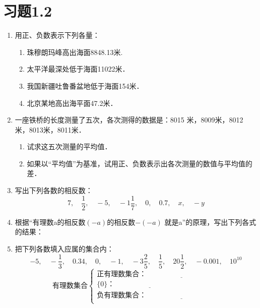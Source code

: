 \section*{习题1.2}
\begin{enumerate}
    \item 用正、负数表示下列各量：
    \begin{enumerate}
        \item 珠穆朗玛峰高出海面8848.13米.
        \item 太平洋最深处低于海面11022米．
        \item 我国新疆吐鲁番盆地低于海面154米．
        \item 北京某地高出海平面47.2米．
    \end{enumerate}
    \item 一座铁桥的长度测量了五次，各次测得的数据是：8015
    米，8009米，8012米，8013米，8011米．
    \begin{enumerate}
        \item 试求这五次测量的平均值．
        \item 如果以“平均值”为基准，试用正、负数表示出各次测量的数值与平均值的差．
    \end{enumerate}
\item 写出下列各数的相反数：
\[7,\quad \frac{1}{2},\quad -5,\quad -1\frac{1}{7},\quad 0,\quad 0.7,\quad x,\quad -y  \]
\item 根据“有理数a的相反数$(- a)$的相反数$-(-a)$
就是a”的原理，写出下列各式的结果：
 \begin{enumerate}
 \end{enumerate}
\item 把下列各数填入应属的集合内：
\[-5,\quad -\frac{1}{3},\quad 0.34,\quad 0,\quad -1,\quad -3\frac{2}{5},\quad \frac{1}{5},\quad 20\frac{1}{2},\quad -0.001,\quad 10^{10} \]
\[\text{有理数集合}\begin{cases}
    \text{正有理数集合：}\underline{\qquad\qquad\qquad\qquad\qquad}\\
    \{0\}： \underline{\qquad\qquad\qquad\qquad\qquad}\\    
    \text{负有理数集合：}\underline{\qquad\qquad\qquad\qquad\qquad}\\
\end{cases}\]



\end{enumerate}
